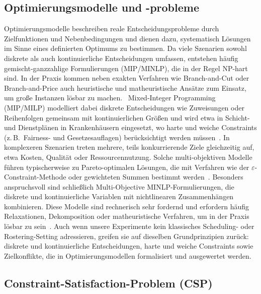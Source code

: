 \documentclass[runningheads]{llncs}
\begin{document}
\subsection{Optimierungsmodelle und -probleme}

Optimierungsmodelle beschreiben reale Entscheidungsprobleme durch Zielfunktionen und Nebenbedingungen und dienen dazu, systematisch Lösungen im Sinne eines definierten Optimums zu bestimmen. Da viele Szenarien sowohl diskrete als auch kontinuierliche Entscheidungen umfassen, entstehen häufig gemischt-ganzzahlige Formulierungen (MIP/MINLP), die in der Regel NP-hart sind. In der Praxis kommen neben exakten Verfahren wie Branch-and-Cut oder Branch-and-Price auch heuristische und matheuristische Ansätze zum Einsatz, um große Instanzen lösbar zu machen.~\cite{ref_article1,ref_article3} Mixed-Integer Programming (MIP/MILP) modelliert dabei diskrete Entscheidungen wie Zuweisungen oder Reihenfolgen gemeinsam mit kontinuierlichen Größen und wird etwa in Schicht- und Dienstplänen in Krankenhäusern eingesetzt, wo harte und weiche Constraints (z.\,B.\ Fairness- und Gesetzesauflagen) berücksichtigt werden müssen~\cite{ref_article2,ref_article3}. In komplexeren Szenarien treten mehrere, teils konkurrierende Ziele gleichzeitig auf, etwa Kosten, Qualität oder Ressourcennutzung. Solche multi-objektiven Modelle führen typischerweise zu Pareto-optimalen Lösungen, die mit Verfahren wie der $\varepsilon$-Constraint-Methode oder gewichteten Summen bestimmt werden~\cite{ref_article1}. Besonders anspruchsvoll sind schließlich Multi-Objective MINLP-Formulierungen, die diskrete und kontinuierliche Variablen mit nichtlinearen Zusammenhängen kombinieren. Diese Modelle sind rechnerisch sehr fordernd und erfordern häufig Relaxationen, Dekomposition oder matheuristische Verfahren, um in der Praxis lösbar zu sein~\cite{ref_article1}. Auch wenn unsere Experimente kein klassisches Scheduling- oder Rostering-Setting adressieren, greifen sie auf dieselben Grundprinzipien zurück: diskrete und kontinuierliche Entscheidungen, harte und weiche Constraints sowie Zielkonflikte, die in Optimierungsmodellen formalisiert und ausgewertet werden.

\subsection{Constraint-Satisfaction-Problem (CSP)}
\end{document}
